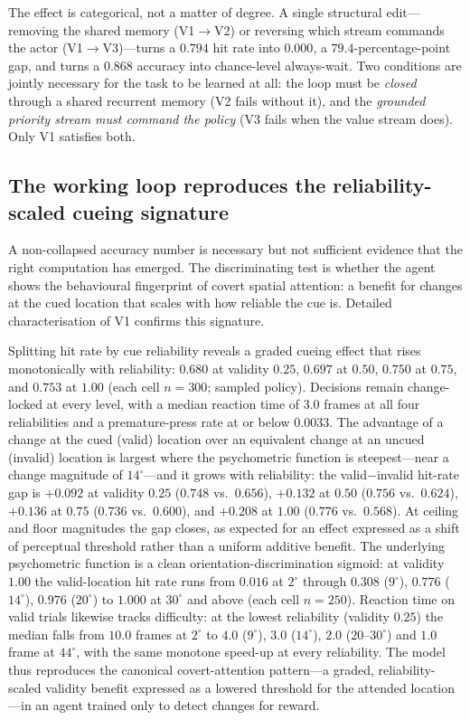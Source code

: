 The effect is categorical, not a matter of degree. A single structural edit---removing the shared memory (V1$\to$V2) or reversing which stream commands the actor (V1$\to$V3)---turns a $0.794$ hit rate into $0.000$, a $79.4$-percentage-point gap, and turns a $0.868$ accuracy into chance-level always-wait. Two conditions are jointly necessary for the task to be learned at all: the loop must be \emph{closed} through a shared recurrent memory (V2 fails without it), and the \emph{grounded priority stream must command the policy} (V3 fails when the value stream does). Only V1 satisfies both.

\subsection{The working loop reproduces the reliability-scaled cueing signature}
A non-collapsed accuracy number is necessary but not sufficient evidence that the right computation has emerged. The discriminating test is whether the agent shows the behavioural fingerprint of covert spatial attention: a benefit for changes at the cued location that scales with how reliable the cue is. Detailed characterisation of V1 confirms this signature.

Splitting hit rate by cue reliability reveals a graded cueing effect that rises monotonically with reliability: $0.680$ at validity $0.25$, $0.697$ at $0.50$, $0.750$ at $0.75$, and $0.753$ at $1.00$ (each cell $n=300$; sampled policy). Decisions remain change-locked at every level, with a median reaction time of $3.0$ frames at all four reliabilities and a premature-press rate at or below $0.0033$. The advantage of a change at the cued (valid) location over an equivalent change at an uncued (invalid) location is largest where the psychometric function is steepest---near a change magnitude of $14^{\circ}$---and it grows with reliability: the valid$-$invalid hit-rate gap is $+0.092$ at validity $0.25$ ($0.748$ vs.\ $0.656$), $+0.132$ at $0.50$ ($0.756$ vs.\ $0.624$), $+0.136$ at $0.75$ ($0.736$ vs.\ $0.600$), and $+0.208$ at $1.00$ ($0.776$ vs.\ $0.568$). At ceiling and floor magnitudes the gap closes, as expected for an effect expressed as a shift of perceptual threshold rather than a uniform additive benefit. The underlying psychometric function is a clean orientation-discrimination sigmoid: at validity $1.00$ the valid-location hit rate runs from $0.016$ at $2^{\circ}$ through $0.308$ ($9^{\circ}$), $0.776$ ($14^{\circ}$), $0.976$ ($20^{\circ}$) to $1.000$ at $30^{\circ}$ and above (each cell $n=250$). Reaction time on valid trials likewise tracks difficulty: at the lowest reliability (validity $0.25$) the median falls from $10.0$ frames at $2^{\circ}$ to $4.0$ ($9^{\circ}$), $3.0$ ($14^{\circ}$), $2.0$ ($20$--$30^{\circ}$) and $1.0$ frame at $44^{\circ}$, with the same monotone speed-up at every reliability. The model thus reproduces the canonical covert-attention pattern---a graded, reliability-scaled validity benefit expressed as a lowered threshold for the attended location---in an agent trained only to detect changes for reward.

